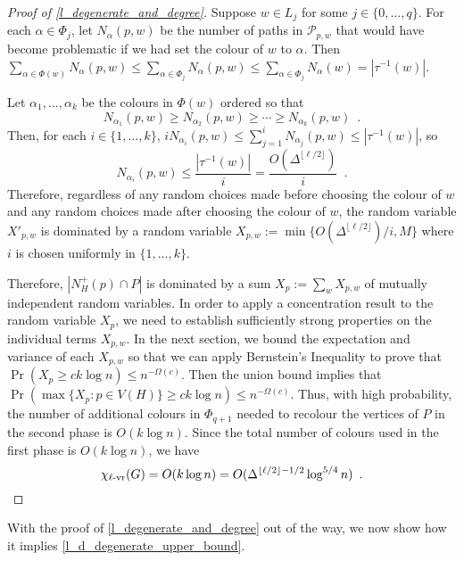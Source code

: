 \documentclass{patmorin}
\newcommand{\rn}[1]{\chi_{\operatorname{#1-vr}}}
\newcommand{\lrn}{\rn{\ell}}
\begin{document}
\begin{proof}[Proof of \cref{l_degenerate_and_degree}]
  Suppose $w\in L_j$ for some $j\in\{0,\ldots,q\}$.  For each $\alpha\in\Phi_j$, let $N_\alpha(p,w)$ be the number of paths in $\mathcal{P}_{p,w}$ that would have become problematic if we had set the colour of $w$ to $\alpha$. Then $\sum_{\alpha\in\Phi(w)} N_\alpha(p,w) \le \sum_{\alpha\in\Phi_j} N_\alpha(p,w) \le \sum_{\alpha\in\Phi_j} N_\alpha(w) = |\tau^{-1}(w)|$.

  Let $\alpha_1,\ldots,\alpha_k$ be the colours in $\Phi(w)$ ordered so that
  \[
    N_{\alpha_1}(p,w) \ge N_{\alpha_2}(p,w) \ge\cdots\ge N_{\alpha_k}(p,w) \enspace .
  \]
  Then, for each $i\in\{1,\ldots,k\}$, $iN_{\alpha_i}(p,w)\le\sum_{j=1}^i N_{\alpha_j}(p,w) \le |\tau^{-1}(w)|$, so
  \[
    N_{\alpha_i}(p,w)\le \frac{|\tau^{-1}(w)|}{i}=\frac{O(\Delta^{\lfloor\ell/2\rfloor})}{i} \enspace .
  \]
  Therefore, regardless of any random choices made before choosing the colour of $w$ and any random choices made after choosing the colour of $w$, the random variable $X'_{p,w}$ is dominated by a random variable $X_{p,w}:=\min\{O(\Delta^{\lfloor\ell/2\rfloor})/i,M\}$ where $i$ is chosen uniformly in $\{1,\ldots,k\}$.

  Therefore, $|N_H^+(p)\cap P|$ is dominated by a sum $X_p:=\sum_{w} X_{p,w}$ of mutually independent random variables.  In order to apply a concentration result to the random variable $X_p$, we need to  establish sufficiently strong properties on the individual terms $X_{p,w}$.  In the next section, we bound the expectation and variance of each $X_{p,w}$ so that we can apply Bernstein's Inequality to prove that $\Pr(X_p\ge ck\log n)\le n^{-\Omega(c)}$.  Then the union bound implies that $\Pr(\max\{X_p:p\in V(H)\} \ge ck\log n)\le n^{-\Omega(c)}$.  Thus, with high probability, the number of additional colours in $\Phi_{q+1}$ needed to recolour the vertices of $P$ in the second phase is $O(k\log n)$.  Since the total number of colours used in the first phase is $O(k\log n)$, we have
  \[
    \lrn(G) = O(k \log n) = O(\Delta^{\lfloor\ell/2\rfloor-1/2}\log^{5/4} n) \enspace . \qedhere
  \]
\end{proof}

With the proof of \cref{l_degenerate_and_degree} out of the way, we now show how it implies \cref{l_d_degenerate_upper_bound}.
\end{document}
